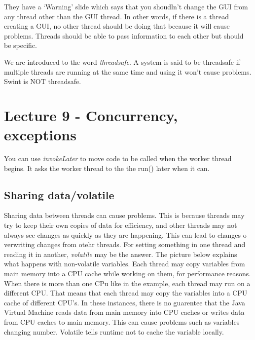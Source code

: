 \documentclass{article}
\begin{document}
They have a `Warning' slide which says that you shoudln't change the GUI from any thread other than
the GUI thread. In other words, if there is a thread creating a GUI, no other thread should be doing that 
because it will cause problems. Threads should be able to pass information to each other but should
be specific.


We are introduced to the word \emph{threadsafe}. A system is said to be threadsafe if multiple threads are 
running at the same time and using it won't cause problems. Swint is NOT threadsafe.

\section{Lecture 9 - Concurrency, exceptions}

You can use \emph{invokeLater} to move code to be called when the worker thread begins. It asks the
worker thread to the the run() later when it can.

\subsection{Sharing data/volatile}

Sharing data between threads can cause problems. This is because threads may try to keep their own copies
of data for efficiency, and other threads may not always see changes as quickly as they are happening.
This can lead to changes o verwriting changes from otehr threads. For setting something in one thread and
reading it in another, \emph{volatile} may be the answer. The picture below explains what happens with
non-volatile variables. Each thread may copy variables from main memory into a CPU cache while working on 
them, for performance reasons. When there is more than one CPu like in the example, each thread may run on a different CPU. That means that each thread may copy the variables into a CPU cache of different CPU's. In these
instances, there is no guarentee that the Java Virtual Machine reads data from main memory into CPU caches
or writes data from CPU caches to main memory. This can cause problems such as variables changing number.
Volatile tells runtime not to cache the variable locally. 
\end{document}
